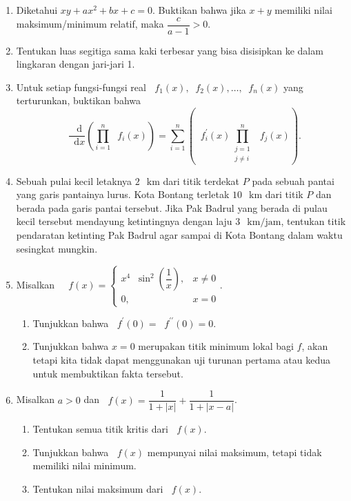 \documentclass[12pt]{article}
\newcommand*\diff{\mathop{}\!\mathrm{d}}
\newcommand*\func[2]{\mathop{}\!{#1}{\left({#2}\right)}}
\newcommand*\ds[1]{\mathop{}\!\displaystyle{{#1}}}
\newcommand*\punit[1]{\mathop{}\!\, \mathrm{{#1}}}
\begin{document}
\begin{enumerate}[leftmargin=*]
		\item Diketahui $ xy + ax^{2} + bx + c = 0 $. Buktikan bahwa jika $ x + y $ memiliki nilai maksimum/minimum relatif, maka $ \dfrac{c}{a - 1} > 0 $.
		\item Tentukan luas segitiga sama kaki terbesar yang bisa disisipkan ke dalam lingkaran dengan jari-jari 1.
		\item Untuk setiap fungsi-fungsi real $ \func{f_{1}}{x}, \func{f_{2}}{x}, \dots, \func{f_{n}}{x} $ yang terturunkan, buktikan bahwa
		\[ \func{\frac{\diff}{\diff{x}}}{\prod_{i = 1}^{n}{\func{f_{i}}{x}}} = \sum_{i = 1}^{n}{\left(\func{f_{i}^{\prime}}{x} \prod_{\substack{j = 1 \\ j \ne i}}^{n}{\func{f_{j}}{x}}\right)}. \]
		\item Sebuah pulai kecil letaknya $ 2 \punit{km} $ dari titik terdekat $ P $ pada sebuah pantai yang garis pantainya lurus. Kota Bontang terletak $ 10 \punit{km} $ dari titik $ P $ dan berada pada garis pantai tersebut. Jika Pak Badrul yang berada di pulau kecil tersebut mendayung ketintingnya dengan laju $ 3 \punit{km/jam} $, tentukan titik pendaratan ketinting Pak Badrul agar sampai di Kota Bontang dalam waktu sesingkat mungkin.
		\item Misalkan $ \ds{\func{f}{x} = \begin{cases}
				x^{4}\func{\sin^{2}}{\dfrac{1}{x}}, & x \ne 0 \\[4pt]
				0, & x = 0
		\end{cases}} $.
		\begin{enumerate}
			\item Tunjukkan bahwa $ \func{f^{\prime}}{0} = \func{f^{\prime\prime}}{0} = 0 $.
			\item Tunjukkan bahwa $ x = 0 $ merupakan titik minimum lokal bagi $ f $, akan tetapi kita tidak dapat menggunakan uji turunan pertama atau kedua untuk membuktikan fakta tersebut.
		\end{enumerate}
		\item Misalkan $ a > 0 $ dan $ \func{f}{x} = \dfrac{1}{1 + \left|x\right|} + \dfrac{1}{1 + \left|x - a\right|} $.
		\begin{enumerate}
			\item Tentukan semua titik kritis dari $ \func{f}{x} $.
			\item Tunjukkan bahwa $ \func{f}{x} $ mempunyai nilai maksimum, tetapi tidak memiliki nilai minimum.
			\item Tentukan nilai maksimum dari $ \func{f}{x} $.
		\end{enumerate}

\end{enumerate}
\end{document}
